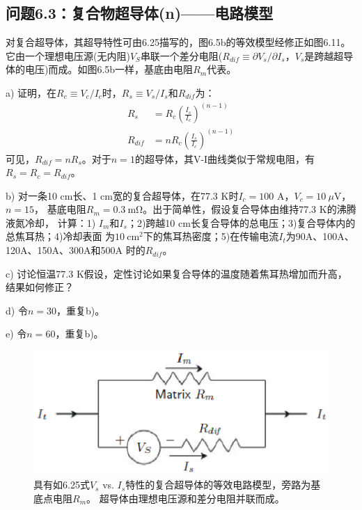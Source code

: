 \subsection{问题6.3：复合物超导体(n)——电路模型}
对复合超导体，其超导特性可由6.25描写的，图6.5b的等效模型经修正如图6.11。
它由一个理想电压源(无内阻)$V_S$串联一个差分电阻($R_{dif}\equiv \partial V_s/\partial I_s$，$V_s$是跨越超导体的电压)而成。如图6.5b一样，基底由电阻$R_m$代表。

a) 证明，在$R_c\equiv V_c/I_c$时，$R_s\equiv V_s/I_s$和$R_{dif}$为：
\begin{subequations}
	\begin{align}
	R_s&=R_c(\frac{I_s}{I_c})^{(n-1)}\\
	R_{dif}&=nR_c(\frac{I_s}{I_c})^{(n-1)}
	\end{align}
\end{subequations}
可见，$R_{dif}=nR_s$。对于$n=1$的超导体，其V-I曲线类似于常规电阻，有$R_s=R_c=R_{dif}$。

b) 对一条10 cm长、1 cm宽的复合超导体，在77.3 K时$I_c=100$ A，$V_c=10\ \mu$V，$n=15$，
基底电阻$R_m=0.3\ \mathrm{m\Omega}$。出于简单性，假设复合导体由维持77.3 K的沸腾液氮冷却， 
计算：1) $I_m$和$I_s$；2)跨越10 cm长复合导体的总电压；3)复合导体内的总焦耳热；4)冷却表面
为$10\ \mathrm{cm^2}$下的焦耳热密度；5)在传输电流$I_t$为90A、100A、120A、150A、300A和500A
时的$R_{dif}$。

c) 讨论恒温77.3 K假设，定性讨论如果复合导体的温度随着焦耳热增加而升高，结果如何修正？

d) 令$n=30$，重复b)。

e) 令$n=60$，重复b)。
\begin{figure}[htbp]
	\centering
	\includegraphics[scale=0.6]{chpt6/figs/fig6.11.eps}
	\caption{具有如6.25式$V_s$ vs. $I_s$特性的复合超导体的等效电路模型，旁路为基底点电阻$R_m$。
	超导体由理想电压源和差分电阻并联而成。}
\end{figure}

